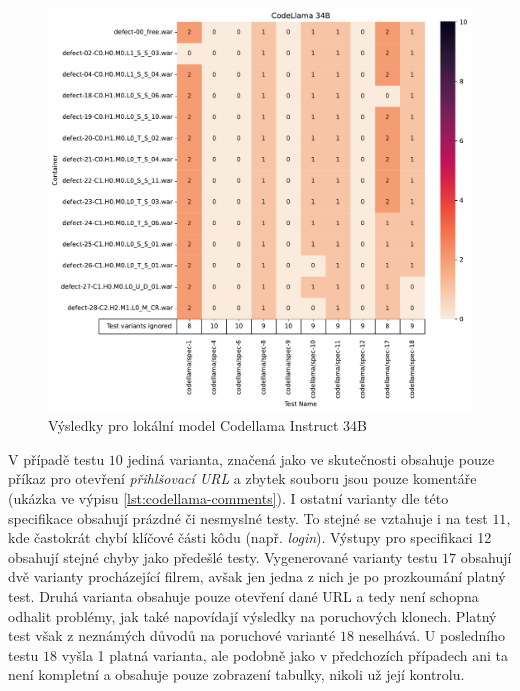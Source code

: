 \documentclass[czech, ma, kiv, he, iso690alph, pdf, viewonly]{fasthesis}
\begin{document}
            \begin{figure}
                \includegraphics[width=\textwidth]{pic/codellama-34b-results.pdf}
                \caption{Výsledky pro lokální model Codellama Instruct 34B}
                \label{fig:res:codellama}
            \end{figure}

            V případě testu \(10\) jediná varianta, značená jako  ve skutečnosti obsahuje pouze příkaz pro otevření \textit{přihlšovací URL} a zbytek souboru jsou pouze komentáře (ukázka ve výpisu \ref{lst:codellama-comments}). I ostatní varianty dle této specifikace obsahují prázdné či nesmyslné testy. To stejné se vztahuje i na test \(11\), kde častokrát chybí klíčové části kôdu (např. \textit{login}). Výstupy pro specifikaci 12 obsahují stejné chyby jako předešlé testy. Vygenerované varianty testu \(17\) obsahují dvě varianty procházející filrem, avšak jen jedna z nich je po prozkoumání platný test. Druhá varianta obsahuje pouze otevření dané URL a tedy není schopna odhalit problémy, jak také napovídají výsledky na poruchových klonech. Platný test však z neznámých důvodů na poruchové varianté \(18\) neselhává. U posledního testu \(18\) vyšla 1 platná varianta, ale podobně jako v předchozích případech ani ta není kompletní a obsahuje pouze zobrazení tabulky, nikoli už její kontrolu.
\end{document}
